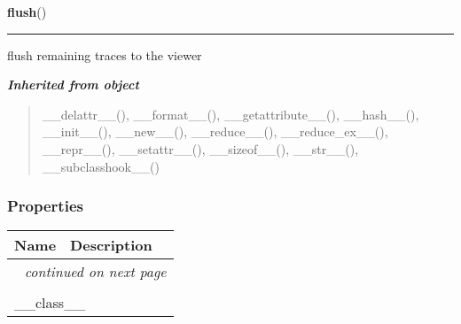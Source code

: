     \vspace{0.5ex}

\hspace{.8\funcindent}\begin{boxedminipage}{\funcwidth}

    \raggedright \textbf{flush}()

    \vspace{-1.5ex}

    \rule{\textwidth}{0.5\fboxrule}
\setlength{\parskip}{2ex}
    flush remaining traces to the viewer

\setlength{\parskip}{1ex}
    \end{boxedminipage}


\large{\textbf{\textit{Inherited from object}}}

\begin{quote}
\_\_delattr\_\_(), \_\_format\_\_(), \_\_getattribute\_\_(), \_\_hash\_\_(), \_\_init\_\_(), \_\_new\_\_(), \_\_reduce\_\_(), \_\_reduce\_ex\_\_(), \_\_repr\_\_(), \_\_setattr\_\_(), \_\_sizeof\_\_(), \_\_str\_\_(), \_\_subclasshook\_\_()
\end{quote}


  \subsubsection{Properties}

    \vspace{-1cm}
\hspace{\varindent}\begin{longtable}{|p{\varnamewidth}|p{\vardescrwidth}|l}
\cline{1-2}
\cline{1-2} \centering \textbf{Name} & \centering \textbf{Description}& \\
\cline{1-2}
\endhead\cline{1-2}\multicolumn{3}{r}{\small\textit{continued on next page}}\\\endfoot\cline{1-2}
\endlastfoot\multicolumn{2}{|l|}{\textit{Inherited from object}}\\
\multicolumn{2}{|p{\varwidth}|}{\raggedright \_\_class\_\_}\\
\cline{1-2}
\end{longtable}



